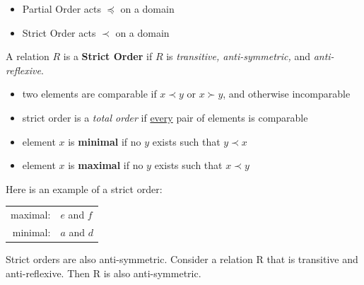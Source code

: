 \begin{itemize}
  \item Partial Order acts $\preceq$ on a domain
  \item Strict Order acts $\prec$ on a domain
\end{itemize}
A relation $R$ is a \textbf{Strict Order} if $R$ is \textit{transitive, anti-symmetric,} and \textit{anti-reflexive}.
\begin{itemize}
  \item two elements are comparable if $x \prec y$ or $x \succ y$, and otherwise incomparable
  \item strict order is a \textit{total order} if \underline{every} pair of elements is comparable
  \item element $x$ is \textbf{minimal} if no $y$ exists such that $y \prec x$
  \item element $x$ is \textbf{maximal} if no $y$ exists such that $x \prec y$
\end{itemize}
Here is an example of a strict order:
\begin{center}
  \qquad
  \begin{tabular}{rl}
    maximal: & $e$ and $f$ \\
    minimal: & $a$ and $d$
  \end{tabular}
\end{center}
Strict orders are also anti-symmetric. Consider a relation R that is transitive and anti-reflexive.
Then R is also anti-symmetric.

